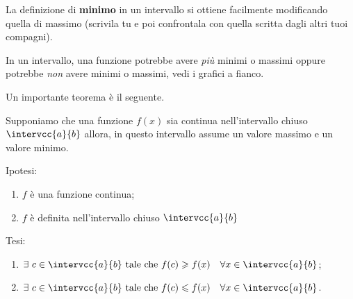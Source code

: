 \begin{minipage}{.25\textwidth}
La definizione di \textbf{minimo} in un intervallo si ottiene facilmente 
modificando quella di massimo (scrivila tu e poi confrontala con quella 
scritta dagli altri tuoi compagni).

In un intervallo, una funzione potrebbe avere \emph{più} minimi o massimi 
oppure potrebbe \emph{non} avere minimi o massimi, vedi i grafici a fianco.
\end{minipage}
\hfill
\begin{minipage}{.68\textwidth}
\begin{center} \contsinusoide \end{center}
\begin{center} \costante \contiperbole \end{center}
\end{minipage}

\newpage %

Un importante teorema è il seguente.

\begin{teorema}
Supponiamo che una funzione \(f(x)\) sia continua nell'intervallo chiuso
\(\intervcc{a}{b}\) allora, in questo intervallo assume un valore massimo e 
un valore minimo.
\end{teorema}
\vspace{-30mm}                           %
\begin{minipage}{.56\textwidth}
\noindent Ipotesi:
\begin{enumerate}[nosep]
 \item \(f\) è una funzione continua;
 \item \(f\) è definita nell'intervallo chiuso \(\intervcc{a}{b}\)
\end{enumerate}

\noindent Tesi: 
\begin{enumerate}[nosep]
 \item \(\exists~c \in \intervcc{a}{b} \text{ tale che }
         f(c) \geqslant f(x) \quad \forall x \in \intervcc{a}{b}\);
 \item \(\exists~c \in \intervcc{a}{b} \text{ tale che }
         f(c) \leqslant f(x) \quad \forall x \in \intervcc{a}{b}\).
\end{enumerate}
\end{minipage}
\hfill
\begin{minipage}{.42\textwidth}
\begin{center} \tweierstrass \end{center}
\end{minipage}

